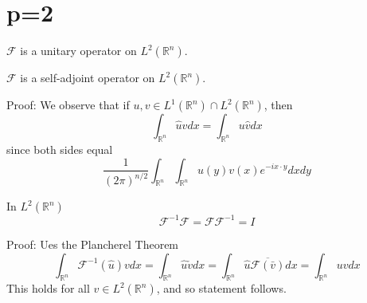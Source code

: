 \documentclass[12pt, a4paper, oneside]{book}
\begin{document}
\section{p=2}
\begin{theorem}
    $\mathcal{F}$ is a unitary operator on $L^2(\mathbb{R}^n)$.
\end{theorem}
\begin{theorem}
    $\mathcal{F}$ is a self-adjoint operator on $L^2(\mathbb{R}^n)$.

    Proof:
    We observe that if $u, v \in L^1(\mathbb{R}^n) \cap L^2\left(\mathbb{R}^n\right)$, then
    \begin{equation*}
        \int_{\mathbb{R}^n} \hat{u} v d x=\int_{\mathbb{R}^n} u \hat{v} d x
    \end{equation*}
    since both sides equal
    \begin{equation*}
        \frac{1}{(2 \pi)^{n / 2}} \int_{\mathbb{R}^n}
        \int_{\mathbb{R}^n}
        u(y) v(x) e^{-i x \cdot y}
        dx dy
    \end{equation*}
\end{theorem}
\begin{theorem}
    In $L^2(\mathbb{R}^n)$
    \begin{equation*}
        \mathcal{F}^{-1}\mathcal{F}
        =\mathcal{F}\mathcal{F}^{-1}
        =I
    \end{equation*}


    Proof:
    Ues the Plancherel Theorem
    \begin{equation*}
        \int_{\mathbb{R}^n}\mathcal{F}^{-1} \left(\hat{u}\right) v d x
        =
        \int_{\mathbb{R}^n} \hat{u} \check{v} d x=\int_{\mathbb{R}^n} \hat{u} \overline{\mathcal{F}(\bar{v})} d x
        =
        \int_{\mathbb{R}^n} u v d x
    \end{equation*}
    This holds for all $v \in L^2\left(\mathbb{R}^n\right)$, and so statement follows.
\end{theorem}
\end{document}
